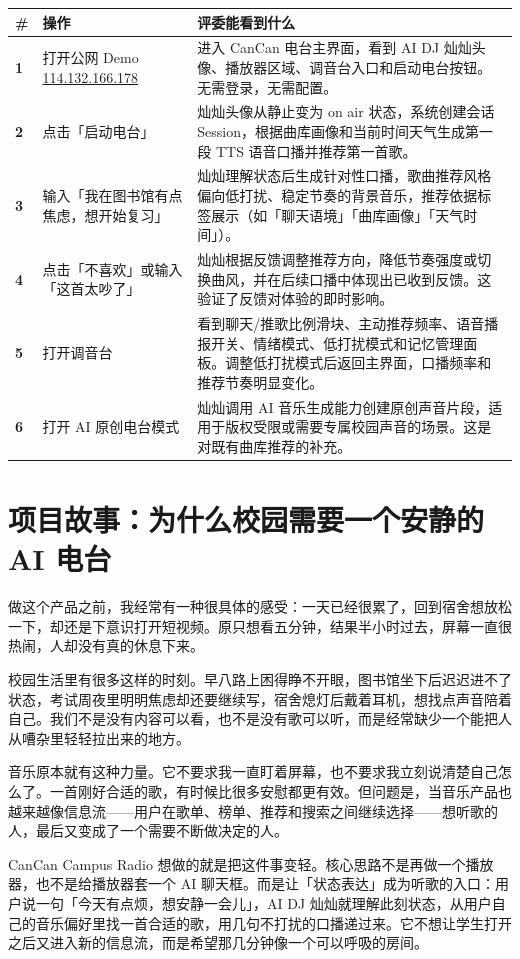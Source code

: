 \documentclass[UTF8,a4paper,11pt,fontset=windows]{ctexart}
\begin{document}
\begin{longtable}{>{\bfseries}p{0.6cm}p{4.7cm}p{9.3cm}}
\toprule
\# & 操作 & 评委能看到什么 \\
\midrule
1 & 打开公网 Demo \href{http://114.132.166.178}{114.132.166.178} & 进入 CanCan 电台主界面，看到 AI DJ 灿灿头像、播放器区域、调音台入口和启动电台按钮。无需登录，无需配置。 \\
2 & 点击「启动电台」 & 灿灿头像从静止变为 on air 状态，系统创建会话 Session，根据曲库画像和当前时间天气生成第一段 TTS 语音口播并推荐第一首歌。 \\
3 & 输入「我在图书馆有点焦虑，想开始复习」 & 灿灿理解状态后生成针对性口播，歌曲推荐风格偏向低打扰、稳定节奏的背景音乐，推荐依据标签展示（如「聊天语境」「曲库画像」「天气时间」）。 \\
4 & 点击「不喜欢」或输入「这首太吵了」 & 灿灿根据反馈调整推荐方向，降低节奏强度或切换曲风，并在后续口播中体现出已收到反馈。这验证了反馈对体验的即时影响。 \\
5 & 打开调音台 & 看到聊天/推歌比例滑块、主动推荐频率、语音播报开关、情绪模式、低打扰模式和记忆管理面板。调整低打扰模式后返回主界面，口播频率和推荐节奏明显变化。 \\
6 & 打开 AI 原创电台模式 & 灿灿调用 AI 音乐生成能力创建原创声音片段，适用于版权受限或需要专属校园声音的场景。这是对既有曲库推荐的补充。 \\
\bottomrule
\end{longtable}

\section{项目故事：为什么校园需要一个安静的 AI 电台}

做这个产品之前，我经常有一种很具体的感受：一天已经很累了，回到宿舍想放松一下，却还是下意识打开短视频。原只想看五分钟，结果半小时过去，屏幕一直很热闹，人却没有真的休息下来。

校园生活里有很多这样的时刻。早八路上困得睁不开眼，图书馆坐下后迟迟进不了状态，考试周夜里明明焦虑却还要继续写，宿舍熄灯后戴着耳机，想找点声音陪着自己。我们不是没有内容可以看，也不是没有歌可以听，而是经常缺少一个能把人从嘈杂里轻轻拉出来的地方。

音乐原本就有这种力量。它不要求我一直盯着屏幕，也不要求我立刻说清楚自己怎么了。一首刚好合适的歌，有时候比很多安慰都更有效。但问题是，当音乐产品也越来越像信息流——用户在歌单、榜单、推荐和搜索之间继续选择——想听歌的人，最后又变成了一个需要不断做决定的人。

CanCan Campus Radio 想做的就是把这件事变轻。核心思路不是再做一个播放器，也不是给播放器套一个 AI 聊天框。而是让「状态表达」成为听歌的入口：用户说一句「今天有点烦，想安静一会儿」，AI DJ 灿灿就理解此刻状态，从用户自己的音乐偏好里找一首合适的歌，用几句不打扰的口播递过来。它不想让学生打开之后又进入新的信息流，而是希望那几分钟像一个可以呼吸的房间。
\end{document}
